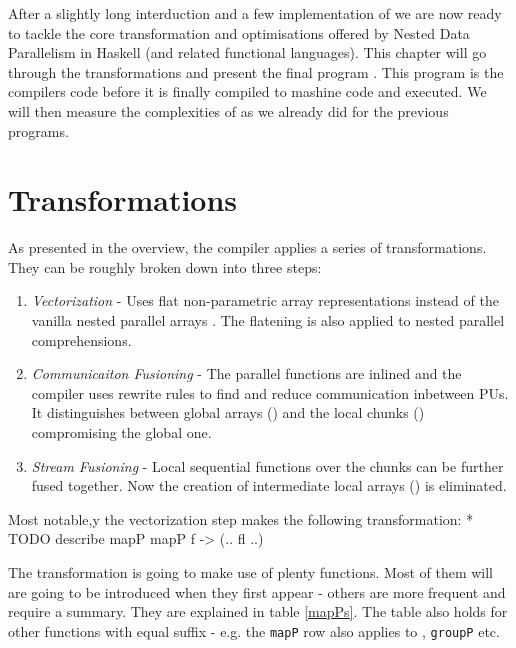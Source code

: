 

  After a slightly long interduction and a few implementation of \algo
  we are now ready to tackle the core transformation and optimisations
  offered by Nested Data Parallelism in Haskell (and related functional languages).
  This chapter will go through the transformations and present the
  final program \ndpv. This program is the compilers code before it is finally compiled to mashine code and executed.
  We will then measure the complexities of \ndpv as we already did for the previous programs.
  
  \section{Transformations}
    As presented in the overview, the compiler applies a series of transformations. They can be
    roughly broken down into three steps:
    \begin{enumerate}
      \item \emph{Vectorization} - Uses flat non-parametric array \pav representations instead of the
            vanilla nested parallel arrays \pan . The flatening is also applied to nested parallel comprehensions.
      \item \emph{Communicaiton Fusioning} - The parallel functions are inlined and the compiler uses rewrite rules to
            find and reduce communication inbetween PUs. It distinguishes between global arrays (\pav) and the local chunks (\pad)
            compromising the global one.
      \item \emph{Stream Fusioning} - Local sequential functions over the chunks can be further fused together. Now
            the creation of intermediate local arrays (\pad) is eliminated.
    \end{enumerate}
    
    Most notable,y the vectorization step makes the following transformation:
    * TODO describe mapP mapP f -> (.. fl ..)
    
    The transformation is going to make use of plenty functions. Most of them will are going to be
    introduced when they first appear - others are more frequent and require a summary. They are explained in table \ref{mapPs}.
    The table also holds for other functions with equal suffix - e.g. the \texttt{mapP} row also applies to , \texttt{groupP} etc.
    
